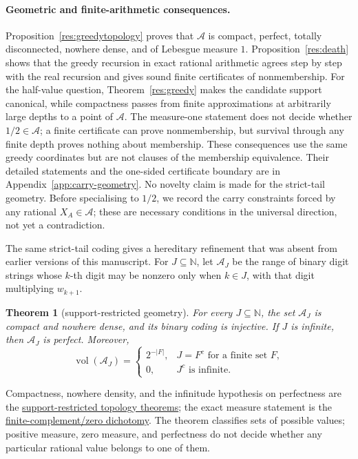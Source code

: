 \documentclass[11pt]{article}
\newcommand{\commit}{bb4e24651b37cd096d3749ef299c3317930b3a3b}
\newcommand{\repobase}{https://github.com/wcook04/plectis-lean-erdos249-257/blob/\commit}
\newtheorem{theorem}{Theorem}[section]
\theoremstyle{definition}
\theoremstyle{remark}
\newcommand{\N}{\mathbb{N}}
\begin{document}
\paragraph{Geometric and finite-arithmetic consequences.}
Proposition~\ref{res:greedytopology} proves that \(\mathcal A\) is compact,
perfect, totally disconnected, nowhere dense, and of Lebesgue measure \(1\).
Proposition~\ref{res:death} shows that the greedy recursion in exact rational
arithmetic agrees step by step with the real recursion and gives sound finite
certificates of nonmembership.
For the half-value question, Theorem~\ref{res:greedy} makes the candidate
support canonical, while compactness passes from finite approximations at
arbitrarily large depths to a point of \(\mathcal A\).  The measure-one statement does
not decide whether \(1/2\in\mathcal A\); a finite certificate can prove
nonmembership, but survival through any finite depth proves nothing about
membership.  These consequences use the same greedy coordinates but are not
clauses of the membership equivalence.  Their detailed statements and the
one-sided certificate boundary are in Appendix~\ref{app:carry-geometry}.  No
novelty claim is made for the strict-tail geometry.  Before specialising to
\(1/2\), we record the carry constraints forced by any rational
\(X_A\in\mathcal A\); these are necessary conditions in the universal
direction, not yet a contradiction.

The same strict-tail coding gives a hereditary refinement that was absent
from earlier versions of this manuscript.  For \(J\subseteq\N\), let
\(\mathcal A_J\) be the range of binary digit strings whose \(k\)-th digit
may be nonzero only when \(k\in J\), with that digit multiplying
\(w_{k+1}\).

\begin{theorem}[support-restricted geometry]\label{res:supportedgeometry}
For every \(J\subseteq\N\), the set \(\mathcal A_J\) is compact and nowhere
dense, and its binary coding is injective.  If \(J\) is infinite, then
\(\mathcal A_J\) is perfect.  Moreover,
\[
 \operatorname{vol}(\mathcal A_J)=
 \begin{cases}
   2^{-|F|},&J=F^c\text{ for a finite set }F,\\
   0,&J^c\text{ is infinite}.
 \end{cases}
\]
\end{theorem}
\noindent Compactness, nowhere density, and the infinitude hypothesis on
perfectness are the
\href{\repobase/ErdosProblems/Erdos257/MersenneSubseriesRigidity.lean\#L90}{support-restricted topology theorems};
the exact measure statement is the
\href{\repobase/ErdosProblems/Erdos257/MersenneSubseriesRigidity.lean\#L397}{finite-complement/zero dichotomy}.
The theorem classifies sets of possible values; positive measure, zero
measure, and perfectness do not decide whether any particular rational value
belongs to one of them.
\end{document}
